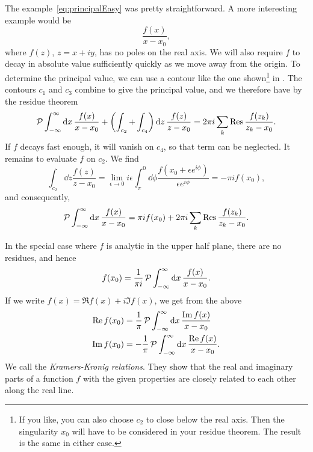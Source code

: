The example~\eqref{eq:principalEasy} was pretty straightforward. A more
interesting example would be
\begin{equation}
  \frac{f(x)}{x-x_0},
\end{equation}
where $f(z)$, $z=x+iy$, has no poles on the real axis. We will also require $f$
to decay in absolute value sufficiently quickly as we move away from the origin.
To determine the principal value, we can use a contour like the one
shown\footnote{If you like, you can also choose $c_2$ to close below the real
axis. Then the singularity $x_0$ will have to be considered in your residue
theorem. The result is the same in either case.}
in . The contours $c_1$ and $c_3$ combine to give
the principal value, and we therefore have by the residue theorem
\begin{equation}
  \principal\int_{-\infty}^{\infty}\dd{x}\frac{f(x)}{x-x_0}
   +\left(\int_{c_2}+\int_{c_4}\right)\dd{z}\frac{f(z)}{z-x_0}
   =2\pi i\sum_k\Res \frac{f(z_k)}{z_k-x_0}. 
\end{equation}
If $f$ decays fast enough, it will vanish on $c_4$, so that term can be
neglected. It remains to evaluate $f$ on $c_2$. We find
\begin{equation}
 \int_{c_2}\dd{z}\frac{f(z)}{z-x_0}
  =\lim_{\epsilon\to0}i\epsilon\int_\pi^0\dd{\phi}
      \frac{f(x_0+\epsilon e^{i\phi})}{\epsilon e^{i\phi}}=-\pi i f(x_0),
\end{equation}
and consequently,
\begin{equation}
  \principal\int_{-\infty}^{\infty}\dd{x}\frac{f(x)}{x-x_0}
   =\pi i f(x_0)+2\pi i\sum_k\Res \frac{f(z_k)}{z_k-x_0}. 
\end{equation}

In the special case where $f$ is analytic in the upper half plane,
there are no residues, and hence
\begin{equation}
  f(x_0)=\frac{1}{\pi i}\,\mathcal{P}
     \int_{-\infty}^{\infty}\dd{x}\frac{f(x)}{x-x_0}.
\end{equation}
If we write $f(x)=\Re f(x)+i\Im f(x)$, we get from the above
\begin{equation}\begin{aligned}\label{eq:kramerKronig}
\mathop{\mathrm{Re}} f(x_0)&=\frac{1}{\pi}\,\mathcal{P}
     \int_{-\infty}^{\infty}\dd{x}\frac{\mathop{\mathrm{Im}} f(x)}{x-x_0}\\
\mathop{\mathrm{Im}} f(x_0)&=-\frac{1}{\pi}\,\mathcal{P}
     \int_{-\infty}^{\infty}\dd{x}\frac{\mathop{\mathrm{Re}} f(x)}{x-x_0}.
\end{aligned}\end{equation}
We call  the 
{\it Kramers-Kronig relations}.
They show that the real and imaginary parts of a function $f$ with the given
properties are closely related to each other along the real line.


